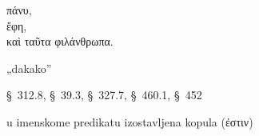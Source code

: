
{\large
\begin{greek}
\noindent πάνυ, \\
ἔφη, \\
καὶ ταῦτα φιλάνθρωπα.\\

\end{greek}
}

\begin{description}[noitemsep,topsep=0pt]
\item[πάνυ] „dakako''
\item[ἔφη] §~312.8, §~39.3, §~327.7, §~460.1, §~452
\item[φιλάνθρωπα] u imenskome predikatu izostavljena kopula (ἐστιν)
\end{description}

